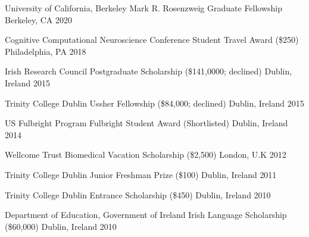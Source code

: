 

\begin{cvhonors}

  \cvhonor
    {University of California, Berkeley} %
    {Mark R. Rosenzweig Graduate Fellowship} %
    {Berkeley, CA} %
    {2020} %
	
  \cvhonor
    {Cognitive Computational Neuroscience Conference} %
    {Student Travel Award (\$250)} %
    {Philadelphia, PA} %
    {2018} %
    
  \cvhonor
    {Irish Research Council} %
    {Postgraduate Scholarship (\$141,0000; declined)} %
    {Dublin, Ireland} %
    {2015} %
    
  \cvhonor
    {Trinity College Dublin} %
    {Ussher Fellowship (\$84,000; declined)} %
    {Dublin, Ireland} %
    {2015} %
	
  \cvhonor
    {US Fulbright Program}
    {Fulbright Student Award (Shortlisted)} %
    {Dublin, Ireland} %
    {2014} %
    
  \cvhonor
    {Wellcome Trust} %
    {Biomedical Vacation Scholarship (\$2,500)} %
    {London, U.K} %
    {2012} %
    
  \cvhonor
    {Trinity College Dublin} %
    {Junior Freshman Prize (\$100)} %
    {Dublin, Ireland} %
    {2011} %
    
  \cvhonor
    {Trinity College Dublin} %
    {Entrance Scholarship (\$450)} %
    {Dublin, Ireland} %
    {2010} %
    
  \cvhonor
    {Department of Education, Government of Ireland} %
    {Irish Language Scholarship (\$60,000)} %
    {Dublin, Ireland} %
    {2010} %

\end{cvhonors}
